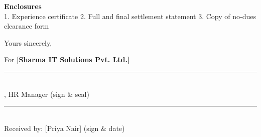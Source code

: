 \documentclass[10pt]{article}
\begin{document}
\noindent\colorbox{notebg}{\parbox{\dimexpr\linewidth-2\fboxsep}{\footnotesize {\color{accent}\bfseries Enclosures}\\ 1. Experience certificate  2. Full and final settlement statement  3. Copy of no-dues clearance form}}\par\vspace{6pt}

Yours sincerely,\par\vspace{4pt}

For \textbf{[Sharma IT Solutions Pvt. Ltd.]}\par\vspace{4pt}

\vspace{32pt}\noindent\parbox[t]{0.3\linewidth}{\centering\rule{\linewidth}{0.5pt}\\ [Anita Deshpande], HR Manager (sign \& seal)}\hfill\parbox[t]{0.3\linewidth}{\centering\rule{\linewidth}{0.5pt}\\ Received by: [Priya Nair] (sign \& date)}\par
\end{document}
